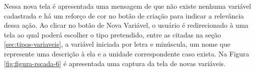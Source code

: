         \begin{figure}[!h]
    	\end{figure}
    	
    	\begin{figure}[!h]
    	\end{figure}

Nessa nova tela é apresentada uma mensagem de que não existe nenhuma variável cadastrada e há um reforço de cor no botão de criação para indicar a relevância dessa ação. Ao clicar no botão de Nova Variável, o usuário é redirecionado à uma tela ao qual poderá escolher o tipo pretendido, entre as citadas na seção \ref{sec:tipos-variaveis}, a variável iniciada por letra e minúscula, um nome que represente uma descrição à ela e a unidade correspondente caso exista. Na Figura \ref{fig:figura-rscada-6} é apresentada uma captura da tela de novas variáveis.

\newpage

        \begin{figure}[!h]
    	\end{figure}
    	
